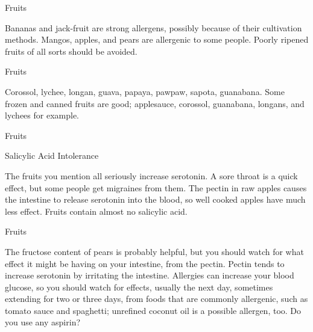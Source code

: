 \documentclass[11pt,oneside,openany,extrafontsizes]{memoir}
\begin{document}
\begin{standalonequote}{Fruits}

    \begin{answer}
        Bananas and jack-fruit are strong allergens, possibly because of their cultivation methods. Mangos, apples, and pears are allergenic to some people. Poorly ripened fruits of all sorts should be avoided.
    \end{answer}
\end{standalonequote}

\begin{standalonequote}{Fruits}

    \begin{answer}
        Corossol, lychee, longan, guava, papaya, pawpaw, sapota, guanabana. Some frozen and canned fruits are good; applesauce, corossol, guanabana, longans, and lychees for example.
    \end{answer}
\end{standalonequote}

\begin{standalonequote}{Fruits}
    \begin{note}
        Salicylic Acid Intolerance
    \end{note}

    \begin{answer}
        The fruits you mention all seriously increase serotonin. A sore throat is a quick effect, but some people get migraines from them. The pectin in raw apples causes the intestine to release serotonin into the blood, so well cooked apples have much less effect. Fruits contain almost no salicylic acid.
    \end{answer}
\end{standalonequote}

\begin{standalonequote}{Fruits}

    \begin{answer}
        The fructose content of pears is probably helpful, but you should watch for what effect it might be having on your intestine, from the pectin. Pectin tends to increase serotonin by irritating the intestine. Allergies can increase your blood glucose, so you should watch for effects, usually the next day, sometimes extending for two or three days, from foods that are commonly allergenic, such as tomato sauce and spaghetti; unrefined coconut oil is a possible allergen, too. Do you use any aspirin?
    \end{answer}
\end{standalonequote}
\end{document}
